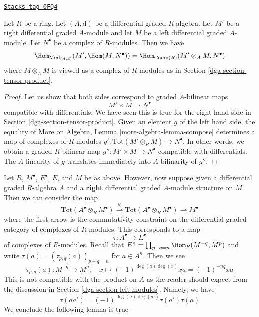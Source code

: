 \begin{lemma}
\label{dga-lemma-characterize-hom}
\href{https://stacks.math.columbia.edu/tag/0FQ4}{\texttt{Stacks tag 0FQ4}}

Let $R$ be a ring. Let $(A, \text{d})$ be a differential graded $R$-algebra.
Let $M'$ be a right differential graded $A$-module and let
$M$ be a left differential graded $A$-module.
Let $N^\bullet$ be a complex of $R$-modules. Then we have
$$
\Hom_{\text{Mod}_{(A, d)}}(M', \Hom(M, N^\bullet)) =
\Hom_{\text{Comp}(R)}(M' \otimes_A M, N^\bullet)
$$
where $M \otimes_A M$ is viewed as a complex of $R$-modules
as in Section \ref{dga-section-tensor-product}.
\end{lemma}

\begin{proof}
Let us show that both sides correspond to graded $A$-bilinear maps
$$
M' \times M \longrightarrow N^\bullet
$$
compatible with differentials. We have seen this is true for the right
hand side in Section \ref{dga-section-tensor-product}. Given an element
$g$ of the left hand side, the equality of
More on Algebra, Lemma \ref{more-algebra-lemma-compose}
determines a map of complexes of $R$-modules
$g' : \text{Tot}(M' \otimes_R M) \to N^\bullet$.
In other words, we obtain a graded $R$-bilinear
map $g'' : M' \times M \to N^\bullet$ compatible with differentials.
The $A$-linearity of $g$ translates immediately
into $A$-bilinarity of $g''$.
\end{proof}

Let $R$, $M^\bullet$, $E^\bullet$, $E$, and $M$ be as above.
However, now suppose given a differential graded $R$-algebra $A$
and a {\bf right} differential graded $A$-module structure on $M$.
Then we can consider the map
$$
\text{Tot}(A^\bullet \otimes_R M^\bullet)
\xrightarrow{\psi}
\text{Tot}(A^\bullet \otimes_R M^\bullet)
\to
M^\bullet
$$
where the first arrow is the commutativity constraint on the
differential graded category of complexes of $R$-modules.
This corresponds to a map
$$
\tau : A^\bullet \longrightarrow E^\bullet
$$
of complexes of $R$-modules. Recall that
$E^n = \prod_{p + q = n} \Hom_R(M^{-q}, M^p)$
and write $\tau(a) = (\tau_{p, q}(a))_{p + q = n}$ for $a \in A^n$.
Then we see
$$
\tau_{p, q}(a) : M^{-q} \longrightarrow M^p,\quad
x \longmapsto (-1)^{\deg(a)\deg(x)}x a = (-1)^{-nq}xa
$$
This is not compatible with the product on $A$ as the reader should
expect from the discussion in Section \ref{dga-section-left-modules}.
Namely, we have
$$
\tau(a a') = (-1)^{\deg(a)\deg(a')}\tau(a') \tau(a)
$$
We conclude the following lemma is true

